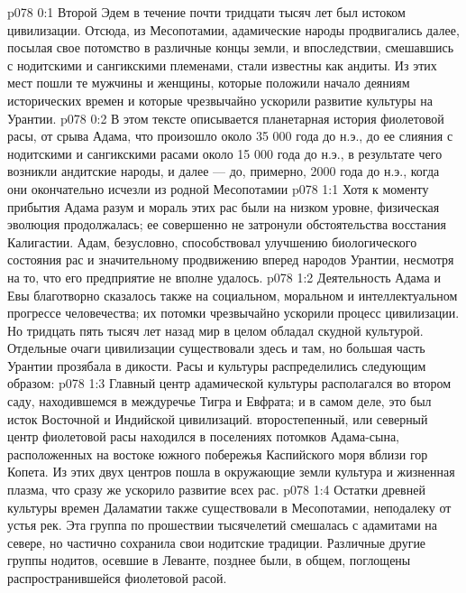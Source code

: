 \author{Архангел}
\vs p078 0:1 Второй Эдем в течение почти тридцати тысяч лет был истоком цивилизации. Отсюда, из Месопотамии, адамические народы продвигались далее, посылая свое потомство в различные концы земли, и впоследствии, смешавшись с нодитскими и сангикскими племенами, стали известны как андиты. Из этих мест пошли те мужчины и женщины, которые положили начало деяниям исторических времен и которые чрезвычайно ускорили развитие культуры на Урантии.
\vs p078 0:2 В этом тексте описывается планетарная история фиолетовой расы, от срыва Адама, что произошло около 35 000 года до н.э., до ее слияния с нодитскими и сангикскими расами около 15 000 года до н.э., в результате чего возникли андитские народы, и далее --- до, примерно, 2000 года до н.э., когда они окончательно исчезли из родной Месопотамии
\vs p078 1:1 Хотя к моменту прибытия Адама разум и мораль этих рас были на низком уровне, физическая эволюция продолжалась; ее совершенно не затронули обстоятельства восстания Калигастии. Адам, безусловно, способствовал улучшению биологического состояния рас и значительному продвижению вперед народов Урантии, несмотря на то, что его предприятие не вполне удалось.
\vs p078 1:2 Деятельность Адама и Евы благотворно сказалось также на социальном, моральном и интеллектуальном прогрессе человечества; их потомки чрезвычайно ускорили процесс цивилизации. Но тридцать пять тысяч лет назад мир в целом обладал скудной культурой. Отдельные очаги цивилизации существовали здесь и там, но большая часть Урантии прозябала в дикости. Расы и культуры распределились следующим образом:
\vs p078 1:3 \bibnobreakspace {} Главный центр адамической культуры располагался во втором саду, находившемся в междуречье Тигра и Евфрата; и в самом деле, это был исток Восточной и Индийской цивилизаций. второстепенный, или северный центр фиолетовой расы находился в поселениях потомков Адама\hyp{}сына, расположенных на востоке южного побережья Каспийского моря вблизи гор Копета. Из этих двух центров пошла в окружающие земли культура и жизненная плазма, что сразу же ускорило развитие всех рас.
\vs p078 1:4 \pc {}\bibnobreakspace {} Остатки древней культуры времен Даламатии также существовали в Месопотамии, неподалеку от устья рек. Эта группа по прошествии тысячелетий смешалась с адамитами на севере, но частично сохранила свои нодитские традиции. Различные другие группы нодитов, осевшие в Леванте, позднее были, в общем, поглощены распространившейся фиолетовой расой.
